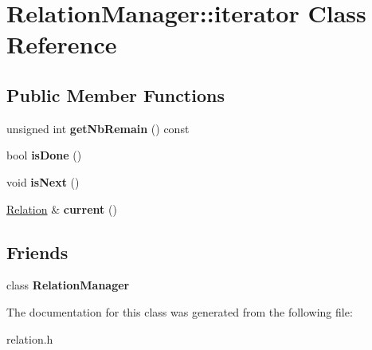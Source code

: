 \hypertarget{classRelationManager_1_1iterator}{}\section{Relation\+Manager\+:\+:iterator Class Reference}
\label{classRelationManager_1_1iterator}
\subsection*{Public Member Functions}
\begin{DoxyCompactItemize}
\item 
\mbox{\label{classRelationManager_1_1iterator_ad0bc40a931bc7e4c54c5751528030bb9}} 
unsigned int {\bfseries get\+Nb\+Remain} () const
\item 
\mbox{\label{classRelationManager_1_1iterator_a318e1802e6d28898c517a8f04a26eb50}} 
bool {\bfseries is\+Done} ()
\item 
\mbox{\label{classRelationManager_1_1iterator_a6a543391a537fe2869a580f4be6fc107}} 
void {\bfseries is\+Next} ()
\item 
\mbox{\label{classRelationManager_1_1iterator_a593cd40f78354ca64669d0478739b00b}} 
\hyperlink{classRelation}{Relation} \& {\bfseries current} ()
\end{DoxyCompactItemize}
\subsection*{Friends}
\begin{DoxyCompactItemize}
\item 
\mbox{\label{classRelationManager_1_1iterator_a55fae9c2e48742dd0a8596e6d8721775}} 
class {\bfseries Relation\+Manager}
\end{DoxyCompactItemize}


The documentation for this class was generated from the following file\+:\begin{DoxyCompactItemize}
\item 
relation.\+h\end{DoxyCompactItemize}
